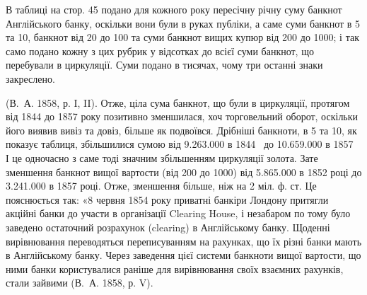 В таблиці на стор. 45 подано для кожного року пересічну річну суму банкнот
Англійського банку, оскільки вони були в руках публіки, а саме суми банкнот
в 5 та 10, банкнот від 20 до 100 та суми банкнот вищих купюр від
200 до 1000; і так само подано кожну з цих рубрик у відсотках до
всієї суми банкнот, що перебували в циркуляції. Суми подано в тисячах, чому
три останні знаки закреслено.

(В.~А. 1858, р. I, II). Отже, ціла сума банкнот, що були в циркуляції, протягом
від 1844 до 1857 року позитивно зменшилася, хоч торговельний оборот,
оскільки його виявив вивіз та довіз, більше як подвоївся. Дрібніші банкноти,
в 5 та 10, як показує таблиця, збільшилися сумою від \num{9.263.000}
в 1844~ до \num{10.659.000} в 1857~ І це одночасно з саме тоді значним
збільшенням циркуляції золота. Зате зменшення банкнот вищої вартости (від
200 до 1000) від \num{5.865.000} в 1852 році до \num{3.241.000} в
1857 році. Отже, зменшення більше, ніж на 2 міл. ф. ст. Це пояснюється
так: «8 червня 1854 року приватні банкіри Лондону притягли акційні банки
до участи в організації Clearing House, і незабаром по тому було заведено
остаточний розрахунок (clearing) в Англійському банку. Щоденні вирівнювання
переводяться переписуванням на рахунках, що їх різні банки мають в Англійському
банку. Через заведення цієї системи банкноти вищої вартости, що ними
банки користувалися раніше для вирівнювання своїх взаємних рахунків, стали
зайвими (В.~А. 1858, р. V).
